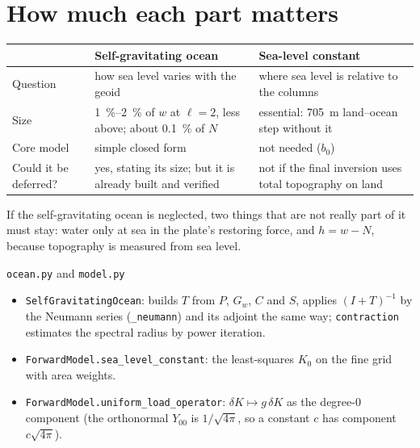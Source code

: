 \section{How much each part matters}
\begin{center}
\small
\begin{tabular}{p{}p{}p{}}
\toprule
& Self-gravitating ocean & Sea-level constant\\
\midrule
Question & how sea level varies with the geoid & where sea level is relative to the columns\\
Size & \qtyrange{1}{2}{\percent} of $w$ at $\ell=2$, less above; about \qty{0.1}{\percent} of $N$ & essential: \qty{705}{m} land--ocean step without it\\
Core model & simple closed form & not needed ($b_0$)\\
Could it be deferred? & yes, stating its size; but it is already built and verified & not if the final inversion uses total topography on land\\
\bottomrule
\end{tabular}
\end{center}
If the self-gravitating ocean is neglected, two things that are not really part of it must stay: water only at sea in the plate's restoring force, and $h = w - N$, because topography is measured from sea level.

\begin{incode}{\texttt{ocean.py} and \texttt{model.py}}
\begin{itemize}[nosep]
\item \texttt{SelfGravitatingOcean}: builds $T$ from $P$, $G_w$, $C$ and $S$, applies $(I+T)^{-1}$ by the Neumann series (\texttt{\_neumann}) and its adjoint the same way; \texttt{contraction} estimates the spectral radius by power iteration.
\item \texttt{ForwardModel.sea\_level\_constant}: the least-squares $K_0$ on the fine grid with area weights.
\item \texttt{ForwardModel.uniform\_load\_operator}: $\delta K \mapsto g\,\delta K$ as the degree-0 component (the orthonormal $Y_{00}$ is $1/\sqrt{4\pi}$, so a constant $c$ has component $c\sqrt{4\pi}$).
\end{itemize}
\end{incode}
